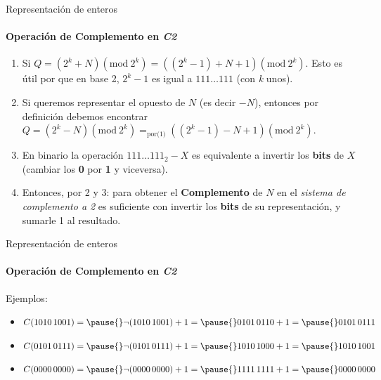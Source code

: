 \documentclass[11pt,a4paper,spanish]{beamer}
\newcommand{\burbuja}[1]{{\textcircled{\small{#1}}}}
\begin{document}
\begin{frame}{Representación de enteros}
    \framesubtitle{Operación de Complemento en \emph{C2}}

    \begin{enumerate}
        \item Si \(Q=(2^{k}+N)(\text{mod}~2^k) =
            ((2^{k}-1)+N+1)(\text{mod}~2^k)\). Esto es útil por que en base 2,
            \(2^{k}-1\) es igual a \(111\ldots{}111\) (con \emph{k} unos).
            \pause
        \item Si queremos representar el opuesto de \(N\) (es decir \(-N\)),
            entonces por definición debemos encontrar
            \(Q=(2^{k}-N)(\text{mod}~2^k) =_{\text{por(1)}}
            ((2^{k}-1)-N+1)(\text{mod}~2^k) \).\pause
        \item En binario la operación \(111\ldots{}111_{2} - X\) es
            equivalente a invertir los \textbf{bits} de \(X\) (cambiar los
            \textbf{0} por \textbf{1} y viceversa). \pause
        \item Entonces, por \burbuja{2} y \burbuja{3}:\pause{} para obtener el
            \textbf{Complemento} de \(N\) en el \emph{sistema de complemento a
            2} es suficiente con invertir los \textbf{bits} de su
            representación, y sumarle 1 al resultado.
    \end{enumerate}
\end{frame}

\begin{frame}{Representación de enteros}
    \framesubtitle{Operación de Complemento en \emph{C2}}

    Ejemplos:

    \begin{itemize}
        \item \(C(1010\,1001) =\pause{} \neg(1010\,1001)+1 =\pause{}
            0101\,0110+1 =\pause{} 0101\,0111\)\pause
        \item \(C(0101\,0111) =\pause{} \neg(0101\,0111)+1 =\pause{}
            1010\,1000+1 =\pause{} 1010\,1001\)\pause
        \item \(C(0000\,0000) =\pause{} \neg(0000\,0000)+1 =\pause{}
            1111\,1111+1 =\pause{} 0000\,0000\)
    \end{itemize}

\end{frame}
\end{document}
